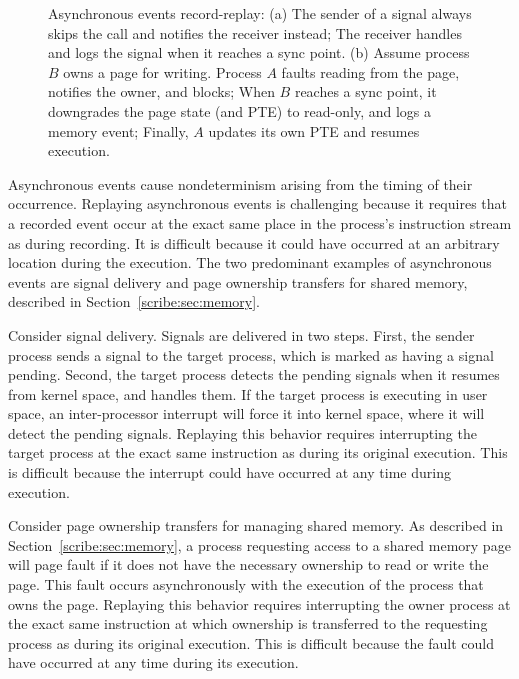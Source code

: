 \begin{figure}[t]
\begin{center}
\begin{tabular}{llll|l}
  \end{tabular}
  \end{center}

  \caption{Asynchronous events record-replay:
    { 
      (a) The sender of a signal always skips the call and notifies
      the receiver instead; The receiver handles and logs the signal
      when it reaches a sync point.
      (b) Assume process $B$ owns a page for writing. Process $A$
      faults reading from the page, notifies the owner, and blocks;
      When $B$ reaches a sync point, it downgrades the page state (and
      PTE) to read-only, and logs a memory event; Finally, $A$ updates
      its own PTE and resumes execution.
    }
  }

  \label{scribe:fig:recasync}
\end{figure}

Asynchronous events cause nondeterminism arising from the timing of
their occurrence.  Replaying asynchronous events is challenging
because it requires that a recorded event occur at the exact same
place in the process's instruction stream as during recording. It is
difficult because it could have occurred at an arbitrary location
during the execution. The two predominant examples of asynchronous
events are signal delivery and page ownership transfers for shared
memory, described in Section~\ref{scribe:sec:memory}.

Consider signal delivery.  Signals are delivered in two steps.  First,
the sender process sends a signal to the target process, which is
marked as having a signal pending.  Second, the target process detects
the pending signals when it resumes from kernel space, and handles
them.  If the target process is executing in user space, an
inter-processor interrupt will force it into kernel space, where it 
will detect the pending signals.  Replaying this behavior requires
interrupting the target process at the exact same instruction as
during its original execution.  This is difficult because the
interrupt could have occurred at any time during execution.

Consider page ownership transfers for managing shared memory.  As
described in Section~\ref{scribe:sec:memory}, a process requesting access to
a shared memory page will page fault if it does not have the necessary
ownership to read or write the page.  This fault occurs asynchronously
with the execution of the process that owns the page.  Replaying this
behavior requires interrupting the owner process at the exact same
instruction at which ownership is transferred to the requesting
process as during its original execution.  This is difficult because
the fault could have occurred at any time during its execution.

